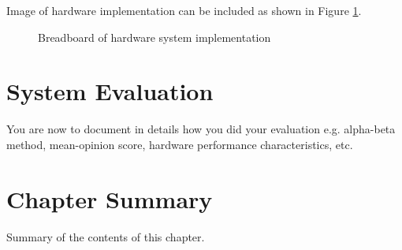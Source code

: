 Image of hardware implementation can be included as shown in Figure \ref{BreadbodaDiag}.
  

\begin{figure}[!h]
	\centering
	\caption{Breadboard of hardware system implementation}
	\label{BreadbodaDiag}
\end{figure}


\section{System Evaluation} You are now to document in details  how you did your evaluation e.g.  alpha-beta method, mean-opinion score, hardware performance characteristics, etc. 





\section{Chapter Summary}

Summary of the contents of this chapter.

